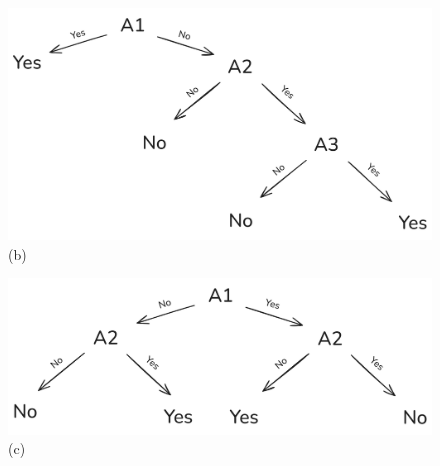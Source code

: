 \documentclass[10pt, oneside]{article}
\begin{document}
\begin{figure}[p]
    \centering
    \centering
    \includegraphics[width=1\textwidth]{./assets/ueb02-5-2.png}
    \caption{(b)}
\end{figure}

\FloatBarrier

\begin{figure}[p]
    \centering
    \includegraphics[width=1\textwidth]{./assets/ueb02-5-3.png}
    \caption{(c)}
\end{figure}

\FloatBarrier
\end{document}
